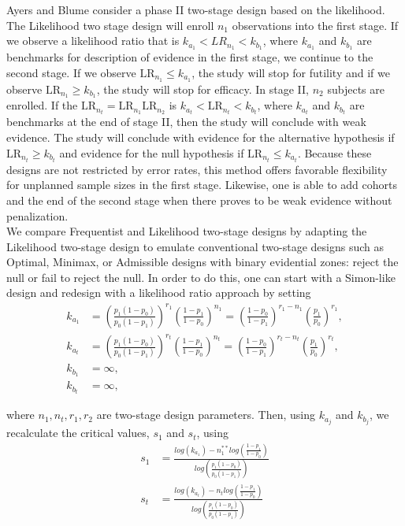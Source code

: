 \documentclass[12pt]{report}\usepackage[]{graphicx}\usepackage[]{color}
\newlength{\li}\setlength{\li}{14.48pt}
\begin{document}
\indent Ayers and Blume \cite{Ayers} consider a phase II two-stage design based on the likelihood. The Likelihood two stage design will enroll $n_1$ observations into the first stage. If we observe a likelihood ratio that is $k_{a_1} < LR_{n_1} < k_{b_1}$, where $k_{a_1}$ and $k_{b_1}$ are benchmarks for description of evidence in the first stage, we continue to the second stage. If we observe $\mbox{LR}_{n_1} \leq k_{a_1}$, the study will stop for futility and if we observe $\mbox{LR}_{n_1} \geq k_{b_1}$, the study will stop for efficacy. In stage II, $n_2$ subjects are enrolled. If the $\mbox{LR}_{n_t} = \mbox{LR}_{n_1}\mbox{LR}_{n_2}$ is $k_{a_t} < \mbox{LR}_{n_t} < k_{b_t}$, where $k_{a_t}$ and $k_{b_t}$ are benchmarks at the end of stage II, then the study will conclude with weak evidence. The study will conclude with evidence for the alternative hypothesis if $\mbox{LR}_{n_t} \geq k_{b_t}$ and evidence for the null hypothesis if $\mbox{LR}_{n_t} \leq k_{a_t}$. Because these designs are not restricted by error rates, this method offers favorable flexibility for unplanned sample sizes in the first stage. Likewise, one is able to add cohorts and the end of the second stage when there proves to be weak evidence without penalization. \\

\indent We compare Frequentist and Likelihood two-stage designs by adapting the Likelihood two-stage design to emulate conventional two-stage designs such as Optimal, Minimax, or Admissible designs with binary evidential zones: reject the null or fail to reject the null. In order to do this, one can start with a Simon-like design and redesign with a likelihood ratio approach by setting
\begin{equation*}
\begin{aligned}
k_{a_1} &= \left(\frac{p_1(1-p_0)}{p_0(1-p_1)}\right)^{r_1} \left(\frac{1-p_1}{1-p_0}\right)^{n_1} = \left(\frac{1-p_0}{1-p_1}\right)^{r_1-n_1} \left(\frac{p_1}{p_0}\right)^{r_1},\\ 
k_{a_t}  &= \left(\frac{p_1(1-p_0)}{p_0(1-p_1)}\right)^{r_t} \left(\frac{1-p_1}{1-p_0}\right)^{n_t} = \left(\frac{1-p_0}{1-p_1}\right)^{r_t-n_t} \left(\frac{p_1}{p_0}\right)^{r_t},\\ k_{b_1} &= \infty, \\
k_{b_t} &= \infty,
\end{aligned}
\end{equation*}

where $n_1, n_t, r_1, r_2$ are two-stage design parameters. Then, using $k_{a_j}$ and $k_{b_j}$, we recalculate the critical values, $s_1$ and $s_t$, using
\begin{equation*}
\begin{aligned}
s_1 &= \frac{log(k_{a_1}) - n_1^{\ast\ast} log(\frac{1-p_1}{1-p_0})}{log(\frac{p_1(1-p_0)}{p_0(1-p_1)})} \\
s_t &= \frac{log(k_{a_t}) - n_t log(\frac{1-p_1}{1-p_0})}{log(\frac{p_1(1-p_0)}{p_0(1-p_1)})}
\end{aligned}
\end{equation*}
\end{document}
